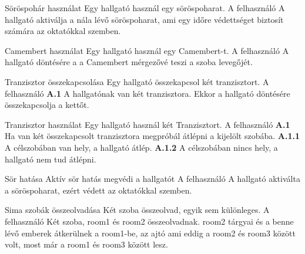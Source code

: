 \begin{use-case}
    {Söröspohár használat}
    {Egy hallgató használ egy söröspoharat.}
    {A felhasználó}
    {A hallgató aktiválja a nála lévő söröspoharat, ami egy időre védettséget biztosít számára az oktatókkal szemben.}
\end{use-case}

\begin{use-case}
    {Camembert használat}
    {Egy hallgató használ egy Camembert-t.}
    {A felhasználó}
    A hallgató döntésére a a Camembert mérgezővé teszi a szoba levegőjét.
\end{use-case}

\begin{use-case}
    {Tranzisztor összekapcsolása}
    {Egy hallgató összekapcsol két tranzisztort.}
    {A felhasználó}
    \textbf{A.1} A hallgatónak van két tranzisztora. Ekkor a hallgató döntésére összekapcsolja a kettőt.  
\end{use-case}

\begin{use-case}
    {Tranzisztor használat}
    {Egy hallgató használ két Tranzisztort.}
    {A felhasználó}
    \textbf{A.1} Ha van két összekapcsolt tranzisztora megpróbál átlépni a kijelölt szobába.
    \newline \textbf{A.1.1} A célszobában van hely, a hallgató átlép.
    \newline \textbf{A.1.2} A célszobában nincs hely, a hallgató nem tud átlépni.      
\end{use-case}

\begin{use-case}
    {Sör hatása}
    {Aktív sör hatás megvédi a hallgatót}
    {A felhasználó}
    {A hallgató aktiválta a söröspoharat, ezért védett az oktatókkal szemben.}
\end{use-case}

\begin{use-case}
    {Sima szobák összeolvadása}
    {Két szoba összeolvad, egyik sem különleges.}
    {A felhasználó}
    Két szoba, room1 és room2 összeolvadnak. room2 tárgyai és a benne lévő emberek átkerülnek a room1-be, az ajtó ami eddig a room2 és room3 között volt, most már a room1 és room3 között lesz. 
\end{use-case}

